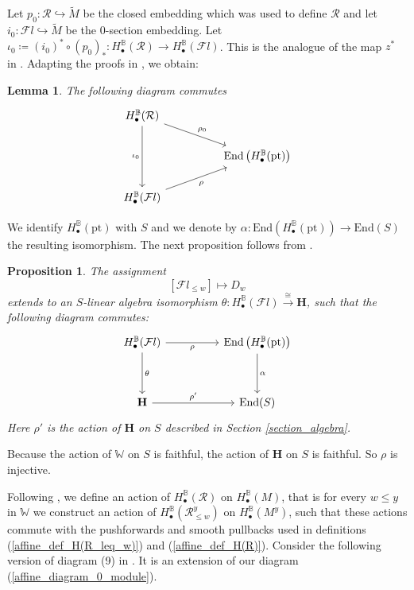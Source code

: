 \documentclass[11pt]{article}
\newcommand{\R}{\mathcal{R}}
\renewcommand{\H}{\textbf{H}}
\newcommand{\bbB}{\mathbb{B}}
\newcommand{\1}{\mathbb{1}}
\newcommand{\tW}{\mathbb{W}}
\newcommand{\HBM}[2]{H_\bullet^{#1}(#2)}
\newcommand{\tM}{\widetilde{M}}
\newcommand{\Fl}{\mathcal{F}l}
\newcommand{\End}{\text{End}}
\newcommand{\pt}{\text{pt}}
\newtheorem{lemma}[theorem]{Lemma}
\newtheorem{proposition}[theorem]{Proposition}
\theoremstyle{definition}
\numberwithin{equation}{section}
\begin{document}
Let $p_0:\R \hookrightarrow \tM$ be the closed embedding which was used to define $\R$ and let $i_0 : \Fl \hookrightarrow \tM$ be the $0$-section embedding. Let $\iota_0\coloneqq (i_0)^* \circ (p_0)_* : \HBM{\bbB}{\R} \rightarrow \HBM{\bbB}{\Fl}$. This is the analogue of the map $z^*$ in \cite[Lemma 5.11]{BFN}. Adapting the proofs in \cite[Proposition 4.15, .3]{HKW}, we obtain:

\begin{lemma}
\label{affine_0_map_to_H}
    The following diagram commutes
    \[\begin{tikzcd}
	\HBM{\bbB}{\R} \\
	&&  \End\left(\HBM{\bbB}{\pt}\right) \\
	\HBM{\bbB}{\Fl}
	\arrow["\rho_0", from=1-1, to=2-3]
	\arrow["\iota_0"', from=1-1, to=3-1]
	\arrow["\rho"', from=3-1, to=2-3]
\end{tikzcd}\]
\end{lemma}

We identify $\HBM{\bbB}{\pt}$ with $S$ and we denote by $\alpha:\End \left( \HBM{\bbB}{\pt}\right) \rightarrow \End (S)$ the resulting isomorphism. The next proposition follows from \cite{KK1}.

\begin{proposition}
\label{affine_H_0_thm}
The assignment
$$\left[ \Fl_{\leq w}\right] \mapsto D_w$$
extends to an $S$-linear algebra isomorphism $\theta : \HBM{\bbB}{\Fl} \xrightarrow{\cong}\H$, such that the following diagram commutes:
    \[\begin{tikzcd}
	\HBM{\bbB}{\Fl} && \End \left( \HBM{\bbB}{\pt}\right) \\
	\\
	\H && \End (S)
	\arrow["\rho"', from=1-1, to=1-3]
	\arrow["\theta", from=1-1, to=3-1]
	\arrow["\alpha", from=1-3, to=3-3]
	\arrow["\rho'",from=3-1, to=3-3]
\end{tikzcd}\]
    Here $\rho'$ is the action of $\H$ on $S$ described in Section \ref{section_algebra}.
\end{proposition}

Because the action of $\tW$ on $S$ is faithful, the action of $\H$ on $S$ is faithful. So $\rho$ is injective.

Following \cite[Theorem 4.9]{HKW}, we define an action of $\HBM{\bbB}{\R}$ on $\HBM{\bbB}{M}$, that is for every $w\leq y$ in $\tW$ we construct an action of $\HBM{\bbB}{\R^y_{\leq w}}$ on $\HBM{\bbB}{M^y}$, such that these actions commute with the pushforwards and smooth pullbacks used in definitions (\ref{affine_def_H(R_leq_w)}) and (\ref{affine_def_H(R)}). Consider the following version of diagram (9) in \cite{HKW}. It is an extension of our diagram (\ref{affine_diagram_0_module}).
\end{document}
